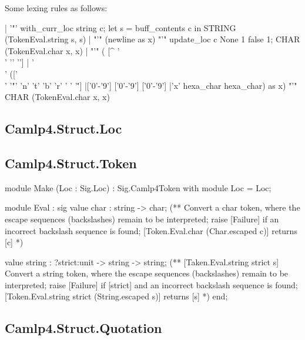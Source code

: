 Some lexing rules as follows:

\begin{ocamlcode}
    | '"'
        { with_curr_loc string c;
          let s = buff_contents c in STRING (TokenEval.string s, s)             }
    | "'" (newline as x) "'"
        { update_loc c None 1 false 1; CHAR (TokenEval.char x, x)               }
    | "'" ( [^ '\\' '' '']
          | '\\' (['\\' '"' 'n' 't' 'b' 'r' ' ' '\'']
                |['0'-'9'] ['0'-'9'] ['0'-'9']
                |'x' hexa_char hexa_char)
          as x) "'"                                { CHAR (TokenEval.char x, x) }
  
\end{ocamlcode}

        
\subsection{Camlp4.Struct.Loc}
\label{Camlp4.Struct.Loc}


\subsection{Camlp4.Struct.Token}
\label{Camlp4.Struct.Token}

\begin{ocamlcode}
module Make (Loc : Sig.Loc) : Sig.Camlp4Token with module Loc = Loc;

module Eval : sig
  value char : string -> char;
      (** Convert a char token, where the escape sequences (backslashes)
          remain to be interpreted; raise [Failure] if an
          incorrect backslash sequence is found; [Token.Eval.char (Char.escaped c)]
          returns [c] *)

  value string : ?strict:unit -> string -> string;
      (** [Taken.Eval.string strict s]
          Convert a string token, where the escape sequences (backslashes)
          remain to be interpreted; raise [Failure] if [strict] and an
          incorrect backslash sequence is found;
          [Token.Eval.string strict (String.escaped s)] returns [s] *)
end;
\end{ocamlcode}

\subsection{Camlp4.Struct.Quotation}
\label{Camlp4.Struct.Quotation}

